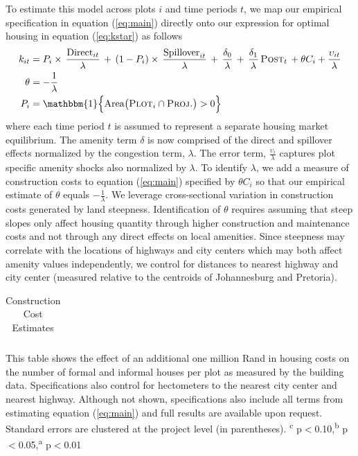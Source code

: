 \documentclass[12pt]{article}
\begin{document}
To estimate this model across plots $i$ and time periods $t$, we map our empirical specification in equation (\ref{eq:main}) directly onto our expression for optimal housing in equation (\ref{eq:kstar}) as follows 
\begin{align}
\label{eq:kstarest}
\begin{split}
k_{it} &= P_i \times \, \frac{\text{Direct}_{it}}{\lambda} \, + \, (1- P_i) \times \, \frac{\text{Spillover}_{it}}{\lambda} \,+\, \frac{\delta_0}{\lambda} \,+\, \frac{\delta_1}{\lambda} \, \textsc{Post}_t \, + \theta C_i + \frac{\upsilon_{it}}{\lambda} \\
\theta &= -\frac{1}{\lambda}  \\
P_i &= \mathbbm{1}\Big\{\text{Area}\big(\textsc{Plot}_i  \cap  \textsc{Proj.}\big)>0\Big \}\,
\end{split}
\end{align}
where each time period $t$ is assumed to represent a separate housing market equilibrium.  The amenity term $\delta$ is now comprised of the direct and spillover effects normalized by the congestion term, $\lambda$.  The error term, $\frac{\upsilon_{i}}{\lambda}$ captures plot specific amenity shocks also normalized by $\lambda$.   To identify $\lambda$, we add a measure of construction costs to equation (\ref{eq:main}) specified by $\theta C_i$ so that our empirical estimate of $\theta$ equals $-\frac{1}{\lambda}$.  We leverage cross-sectional variation in construction costs generated by land steepness.  Identification of $\theta$ requires assuming that steep slopes only affect housing quantity through higher construction and maintenance costs and not through any direct effects on local amenities.  Since steepness may correlate with the locations of highways and city centers which may both affect amenity values independently, we control for distances to nearest highway and city center (measured relative to the centroids of Johannesburg and Pretoria).


\begin{table}
\small
\centering
\caption{Construction Cost Estimates}\label{table:ccost}
\vspace{-2mm}
\begin{threeparttable}
\begin{tabular}{lCCCCC}
\toprule

\bottomrule
\end{tabular}
\begin{tablenotes}
\item \footnotesize  This table shows the effect of an additional one million Rand in housing costs on the number of formal and informal houses per plot as measured by the building data.  Specifications also control for hectometers to the nearest city center and nearest highway.  Although not shown, specifications also include all terms from estimating equation (\ref{eq:main}) and full results are available upon request.  Standard errors are clustered at the project level (in parentheses). 
\textsuperscript{c} p$<$0.10,\textsuperscript{b} p$<$0.05,\textsuperscript{a} p$<$0.01 \,\,
\end{tablenotes}
\end{threeparttable}
\end{table}
\end{document}
